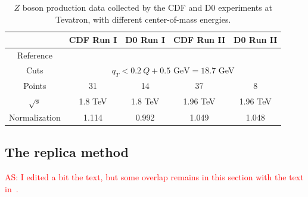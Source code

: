 \documentclass[aps,preprintnumbers,showpacs,nofootinbib,superscriptaddress,floatfix]{revtex4}
\begin{document}
\begin{table}[h!]
\begin{center}
\renewcommand{\tabcolsep}{0.4pc} %
\renewcommand{\arraystretch}{1.2} %
\begin{tabular}{|c|c|c|c|c|}
 \hline
 ~                        & CDF Run I    &  D0 Run I        & CDF Run II        & D0 Run II      \\
 \hline
 Reference        &\cite{Affolder:1999jh} &\cite{Abbott:1999wk}&\cite{Aaltonen:2012fi}&\cite{Abazov:2007ac} \\
\hline
Cuts             & \multicolumn{4}{c|}{$q_T< 0.2\ Q +0.5 \text{ GeV}=18.7$ GeV}                                  \\
\hline
 Points                   &      31      &   14             &       37          &        8       \\
 \hline
 $\sqrt{s}$               &      1.8 TeV &   1.8 TeV        &       1.96 TeV    &       1.96 TeV   \\
 \hline
Normalization        &  1.114       &    0.992          &       1.049        &       1.048    \\
\hline
\end{tabular}
\caption{$Z$ boson production data collected by the CDF and D0 experiments at Tevatron, with different center-of-mass energies.}
\label{t:data_Z}
\end{center}
\end{table}



\subsection{The replica method}
\label{ss:replica_method}

\textcolor{red}{AS: I edited a bit the text, but some overlap remains in this section with the text in~\cite{Signori:2013mda}.}
\end{document}
